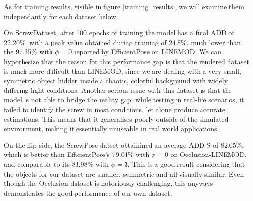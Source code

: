 As for training results, visible in figure \ref{training_results}, we will examine them independantly for each dataset below.

On ScrewDataset, after 100 epochs of training the model has a final ADD of 22.20\%, with a peak value obtained during training of 24.8\%, much lower than the 97.35\% with $\phi=0$ reported by EfficientPose on LINEMOD. We can hypothesize that the reason for this performance gap is that the rendered dataset is much more difficult than LINEMOD, since we are dealing with a very small, symmetric object hidden inside a chaotic, colorful background with widely differing light conditions. Another serious issue with this dataset is that the model is not able to bridge the reality gap: while testing in real-life scenarios, it failed to identify the screw in most conditions, let alone produce accurate estimations. This means that it generalises poorly outside of the simulated environment, making it essentially unuseable in real world applications.

On the flip side, the ScrewPose datset obtainined an average ADD-S of 82.05\%, which is better than EfficientPose's 79.04\% with $\phi=0$ on Occlusion-LINEMOD, and comparable to its 83.98\% with $\phi = 3$. This is a good result considering that the objects for our dataset are smaller, symmetric and all visually similar. Even though the Occlusion dataset is notoriously challenging, this anyways demonstrates the good performance of our own dataset.

